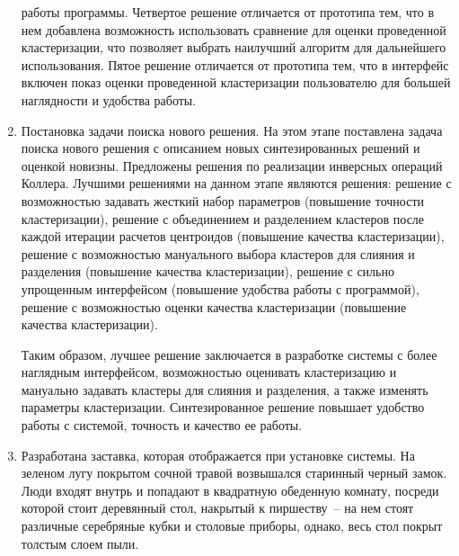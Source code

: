 \begin{enumerate}
    работы программы.
    Четвертое решение отличается от прототипа тем, что в нем добавлена
    возможность использовать сравнение для оценки проведенной кластеризации,
    что позволяет выбрать наилучший алгоритм для дальнейшего использования.
    Пятое решение отличается от прототипа тем, что в интерфейс включен показ
    оценки проведенной кластеризации пользователю для большей наглядности и
    удобства работы.
  \item Постановка задачи поиска нового решения. На этом этапе поставлена
    задача поиска нового решения с описанием новых синтезированных решений и
    оценкой новизны. Предложены решения по реализации инверсных операций
    Коллера. Лучшими решениями на данном этапе являются решения:
    решение с возможностью задавать жесткий набор параметров (повышение
    точности кластеризации), решение с объединением и разделением кластеров
    после каждой итерации расчетов центроидов (повышение качества
    кластеризации), решение с возможностью мануального выбора кластеров для
    слияния и разделения (повышение качества кластеризации), решение с сильно
    упрощенным интерфейсом (повышение удобства работы с программой), решение с
    возможностью оценки качества кластеризации (повышение качества
    кластеризации).
    
    Таким образом, лучшее решение заключается в разработке системы с более
    наглядным интерфейсом, возможностью оценивать кластеризацию и мануально
    задавать кластеры для слияния и разделения, а также изменять параметры
    кластеризации. Синтезированное решение повышает удобство работы с системой,
    точность и качество ее работы.
  \item Разработана заставка, которая отображается при установке системы. 
    На зеленом лугу покрытом сочной травой возвышался старинный черный замок.
    Люди входят внутрь и попадают в квадратную обеденную комнату, посреди
    которой стоит деревянный стол, накрытый к пиршеству~-- на нем стоят
    различные серебряные кубки и столовые приборы, однако, весь стол покрыт
    толстым слоем пыли.
\end{enumerate}